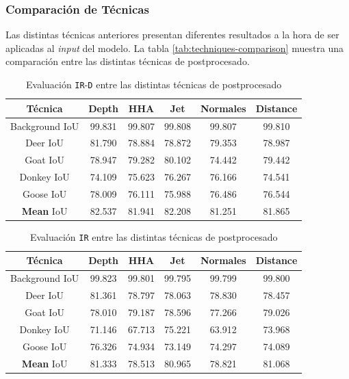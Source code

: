\documentclass[12pt,a4paper]{report}
\begin{document}
\subsubsection{Comparación de Técnicas}
\label{subsubsec:techniques_comparison}
Las distintas técnicas anteriores presentan diferentes resultados a la hora de ser aplicadas al \textit{input} del modelo. La tabla \ref{tab:techniques-comparison} muestra una comparación entre las distintas técnicas de postprocesado.
\begin{table}
    \centering
    \begin{tabular}{|c|c|c|c|c|c|}
        \hline
        Técnica & Depth & HHA & Jet & Normales & Distance \\
        \hline
        \hline
        Background IoU & 99.831 & 99.807 & 99.808 & 99.807 & 99.810 \\
        \hline
        Deer IoU & 81.790 & 78.884 & 78.872 & 79.353 & 78.987\\
        \hline
        Goat IoU & 78.947 & 79.282 & 80.102 & 74.442 & 79.442\\
        \hline
        Donkey IoU & 74.109 & 75.623 & 76.267 & 76.166 & 74.541 \\
        \hline
        Goose IoU & 78.009 & 76.111 & 75.988 & 76.486 & 76.544\\
        \hline
        \textbf{Mean} IoU & 82.537 & 81.941 & 82.208 & 81.251 & 81.865\\
        \hline
    \end{tabular}
    \caption{Evaluación \texttt{IR}-\texttt{D} entre las distintas técnicas de postprocesado}
    \label{tab:techniques-ird-comparison}
\end{table}
\begin{table}
    \centering
    \begin{tabular}{|c|c|c|c|c|c|}
        \hline
        Técnica & Depth & HHA & Jet & Normales & Distance \\
        \hline
        \hline
        Background IoU & 99.823 & 99.801 & 99.795 & 99.799 & 99.800\\
        \hline
        Deer IoU & 81.361 & 78.797 & 78.063 & 78.830 & 78.457\\
        \hline
        Goat IoU & 78.010 & 79.187 & 78.596 & 77.266 & 79.026\\
        \hline
        Donkey IoU & 71.146 & 67.713 & 75.221 & 63.912 & 73.968\\
        \hline
        Goose IoU & 76.326 & 74.934 & 73.149 & 74.297 & 74.089\\
        \hline
        \textbf{Mean} IoU & 81.333 & 78.513 & 80.965 & 78.821 & 81.068\\
        \hline
    \end{tabular}
    \caption{Evaluación \texttt{IR} entre las distintas técnicas de postprocesado}
    \label{tab:techniques-ir-comparison}
\end{table}
\end{document}
